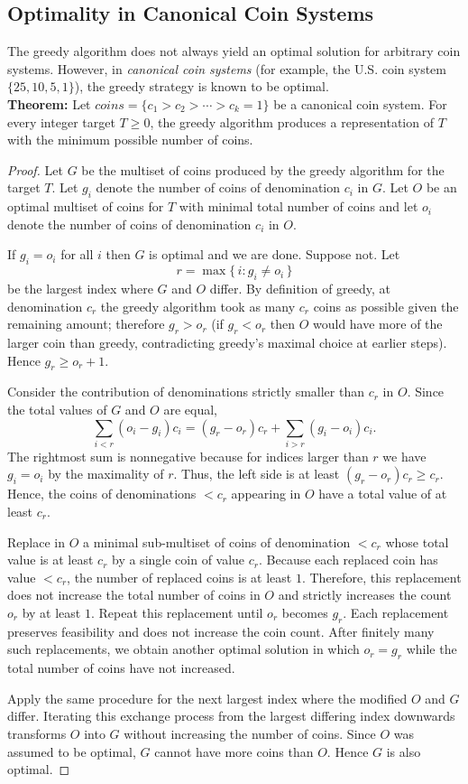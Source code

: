 \documentclass[12pt,a4paper]{report}
\begin{document}
\subsection{Optimality in Canonical Coin Systems}
The greedy algorithm does not always yield an optimal solution for arbitrary coin systems.  
However, in \emph{canonical coin systems} (for example, the U.S. coin system $\{25,10,5,1\}$), the greedy strategy is known to be optimal. \\

\textbf{Theorem:}
Let $coins=\{c_1>c_2>\cdots>c_k=1\}$ be a canonical coin system. For every integer target $T\ge0$, the greedy algorithm produces a representation of $T$ with the minimum possible number of coins.

\begin{proof}
Let $G$ be the multiset of coins produced by the greedy algorithm for the target $T$. Let $g_i$ denote the number of coins of denomination $c_i$ in $G$. Let $O$ be an optimal multiset of coins for $T$ with minimal total number of coins and let $o_i$ denote the number of coins of denomination $c_i$ in $O$.

If $g_i=o_i$ for all $i$ then $G$ is optimal and we are done. Suppose not. Let
\[
r=\max\{\,i: g_i\ne o_i\,\}
\]
be the largest index where $G$ and $O$ differ. By definition of greedy, at denomination $c_r$ the greedy algorithm took as many $c_r$ coins as possible given the remaining amount; therefore $g_r>o_r$ (if $g_r<o_r$ then $O$ would have more of the larger coin than greedy, contradicting greedy's maximal choice at earlier steps). Hence $g_r\ge o_r+1$.

Consider the contribution of denominations strictly smaller than $c_r$ in $O$. Since the total values of $G$ and $O$ are equal,
\[
\sum_{i<r} (o_i-g_i)c_i = (g_r-o_r)c_r + \sum_{i>r} (g_i-o_i)c_i.
\]
The rightmost sum is nonnegative because for indices larger than $r$ we have $g_i=o_i$ by the maximality of $r$. Thus, the left side is at least $(g_r-o_r)c_r\ge c_r$.
Hence, the coins of denominations $<c_r$ appearing in $O$ have a total value of at least $c_r$.

Replace in $O$ a minimal sub-multiset of coins of denomination $<c_r$ whose total value is at least $c_r$ by a single coin of value $c_r$. Because each replaced coin has value $<c_r$, the number of replaced coins is at least $1$. Therefore, this replacement does not increase the total number of coins in $O$ and strictly increases the count $o_r$ by at least $1$. Repeat this replacement until $o_r$ becomes $g_r$. Each replacement preserves feasibility and does not increase the coin count. After finitely many such replacements, we obtain another optimal solution in which $o_r=g_r$ while the total number of coins have not increased.

Apply the same procedure for the next largest index where the modified $O$ and $G$ differ. Iterating this exchange process from the largest differing index downwards transforms $O$ into $G$ without increasing the number of coins. Since $O$ was assumed to be optimal, $G$ cannot have more coins than $O$. Hence $G$ is also optimal.
\end{proof}
\end{document}
